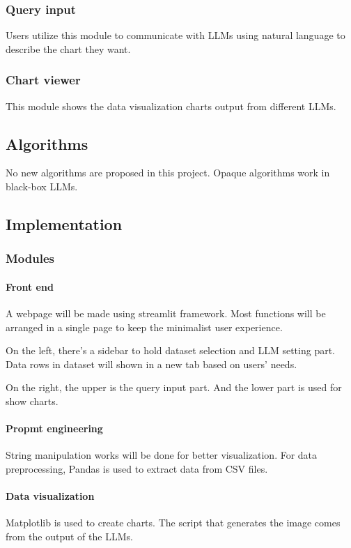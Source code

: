 \documentclass[conference]{IEEEtran}
\begin{document}
\subsubsection{Query input}
Users utilize this module to communicate with LLMs using natural language to describe the chart they want.

\subsubsection{Chart viewer}
This module shows the data visualization charts output from different LLMs. 

\subsection{Algorithms}
No new algorithms are proposed in this project. Opaque algorithms work in black-box LLMs.

\subsection{Implementation}
\subsubsection{Modules}
\paragraph{Front end}
A webpage will be made using streamlit framework. Most functions will be arranged in a single page to keep the minimalist user experience.

On the left, there's a sidebar to hold dataset selection and LLM setting part. Data rows in dataset will shown in a new tab based on users' needs.

On the right, the upper is the query input part. And the lower part is used for show charts.

\paragraph{Propmt engineering}
String manipulation works will be done for better visualization. For data preprocessing, Pandas is used to extract data from CSV files.

\paragraph{Data visualization}
Matplotlib is used to create charts. The script that generates the image comes from the output of the LLMs.
\end{document}
